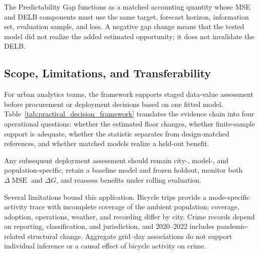 The Predictability Gap functions as a matched accounting quantity whose MSE
and DELB components must use the
same target, forecast horizon, information set, evaluation sample, and loss.
A negative gap change means that the tested model did not realize the added
estimated opportunity; it does not invalidate the DELB.


\subsection{Scope, Limitations, and Transferability}
\label{subsec:limitations}

For urban analytics teams, the framework supports staged data-value
assessment before procurement or deployment decisions based on one fitted model.
Table~\ref{tab:practical_decision_framework} translates the evidence chain
into four operational questions: whether the estimated floor changes,
whether finite-sample support is adequate, whether the statistic separates
from design-matched references, and whether matched models realize a held-out
benefit.



Any subsequent deployment assessment should remain city-, model-, and
population-specific, retain a baseline model and frozen holdout, monitor both
\(\Delta\operatorname{MSE}\) and \(\Delta G\), and reassess benefits under
rolling evaluation.

Several limitations bound this application. Bicycle trips provide a
mode-specific activity trace with incomplete coverage of the ambient population;
coverage, adoption, operations, weather, and recording differ by city.
Crime records depend on reporting, classification, and jurisdiction, and
2020--2022 includes pandemic-related structural change. Aggregate
grid--day associations do not support individual inference or a causal
effect of bicycle activity on crime.


